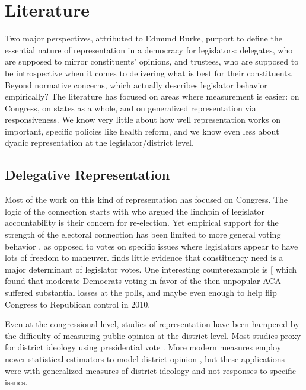 \documentclass[
  oneside]{book}
\begin{document}
\hypertarget{literature}{%
\chapter{Literature}\label{literature}}

Two major perspectives, attributed to Edmund Burke, purport to define the essential nature of representation in a democracy for legislators: delegates, who are supposed to mirror constituents' opinions, and trustees, who are supposed to be introspective when it comes to delivering what is best for their constituents. Beyond normative concerns, which actually describes legislator behavior empirically? The literature has focused on areas where measurement is easier: on Congress, on states as a whole, and on generalized representation via responsiveness. We know very little about how well representation works on important, specific policies like health reform, and we know even less about dyadic representation at the legislator/district level.

\hypertarget{delegative-representation}{%
\section{Delegative Representation}\label{delegative-representation}}

Most of the work on this kind of representation has focused on Congress. The logic of the connection starts with \citet{Mayhew:1974} who argued the linchpin of legislator accountability is their concern for re-election. Yet empirical support for the strength of the electoral connection has been limited to more general voting behavior \citep{Canes-Wrone:2002}, as opposed to votes on specific issues where legislators appear to have lots of freedom to maneuver. \citet{Poole:2007a} finds little evidence that constituency need is a major determinant of legislator votes. One interesting counterexample is {[}\citet{Nyhan:2012} which found that moderate Democrats voting in favor of the then-unpopular ACA suffered substantial losses at the polls, and maybe even enough to help flip Congress to Republican control in 2010.

Even at the congressional level, studies of representation have been hampered by the difficulty of measuring public opinion at the district level. Most studies proxy for district ideology using presidential vote \citep{Levendusky:2008, Kernell:2009}. More modern measures employ newer statistical estimators to model district opinion \citep{Tausanovitch:2013, ShorKousserPhillips:2016}, but these applications were with generalized measures of district ideology and not responses to specific issues.
\end{document}
